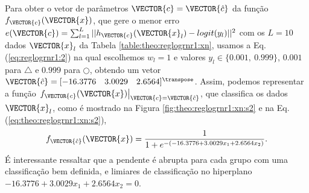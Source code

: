 \begin{SolutionT}\label{sol:theo:reglogrnr1:s2}
Para obter o vetor de parâmetros $\VECTOR{c}=\VECTOR{\hat{c}}$ da função $f_{\VECTOR{c}}(\VECTOR{x})$, 
que gere o menor erro $e(\VECTOR{c}) =  \sum_{l=1}^{L} ||h_{\VECTOR{c}}(\VECTOR{x}_l)-logit(y_l)||^2$
com os $L=10$ dados $\VECTOR{x}_l$ da Tabela \ref{table:theo:reglogrnr1:xn},
usamos a Eq. (\ref{eq:reglogrnr1:2}) na qual escolhemos $w_l=1$ e valores $y_l \in \{0.001,~ 0.999\}$,
$0.001$ para $\bigtriangleup$ e $0.999$ para $\bigcirc$,
obtendo um vetor $\VECTOR{\hat{c}}=[-16.3776\quad 3.0029\quad 2.6564]^{\transpose}$. 
Assim, podemos representar a função $\left.f_{\VECTOR{c}}(\VECTOR{x})\right|_{\VECTOR{c}=\VECTOR{\hat{c}}}$, 
que classifica os dados $\VECTOR{x}_l$, 
como é mostrado na Figura \ref{fig:theo:reglogrnr1:xn:s2} e na Eq. (\ref{eq:theo:reglogrnr1:xn:s2}),
\begin{equation}\label{eq:theo:reglogrnr1:xn:s2}
f_{\VECTOR{\hat{c}}}(\VECTOR{x})= \frac{1}{1+e^{-(-16.3776+3.0029 x_1 +2.6564 x_2)}}.
\end{equation}
É interessante ressaltar que a pendente é abrupta para cada grupo com uma classificação bem definida,
e limiares de classificação no hiperplano $-16.3776+3.0029 x_1 +2.6564 x_2=0$.
\end{SolutionT}
